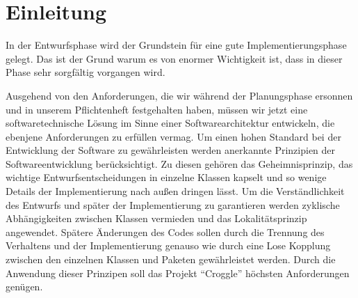 \section{Einleitung}

In der Entwurfsphase wird der Grundstein für eine gute Implementierungsphase gelegt. Das ist der Grund warum es von enormer Wichtigkeit ist, dass in dieser Phase sehr sorgfältig vorgangen wird.

Ausgehend von den Anforderungen, die wir während der Planungsphase ersonnen und in unserem Pflichtenheft festgehalten haben, müssen wir jetzt eine softwaretechnische Lösung im Sinne einer Softwarearchitektur entwickeln, die ebenjene Anforderungen zu erfüllen vermag.
Um einen hohen Standard bei der Entwicklung der Software zu gewährleisten werden anerkannte Prinzipien der
Softwareentwicklung berücksichtigt. Zu diesen gehören das Geheimnisprinzip, das wichtige 
Entwurfsentscheidungen in einzelne Klassen kapselt und so wenige Details der Implementierung nach außen dringen lässt. Um die Verständlichkeit des Entwurfs und später der Implementierung zu garantieren 
werden zyklische Abhängigkeiten zwischen Klassen vermieden und das Lokalitätsprinzip angewendet. Spätere
 Änderungen des Codes sollen durch die Trennung des Verhaltens und der Implementierung genauso wie durch eine Lose Kopplung zwischen den einzelnen Klassen und Paketen gewährleistet werden. Durch die Anwendung
dieser Prinzipen soll das Projekt "`Croggle"' höchsten Anforderungen genügen. 
